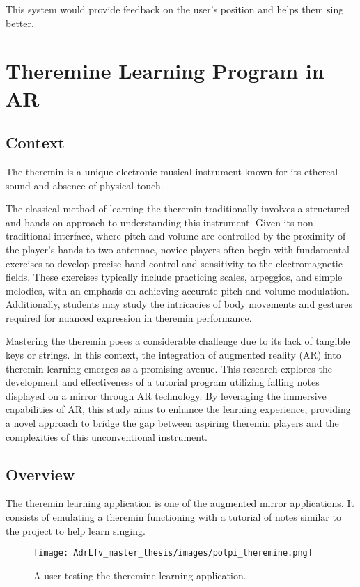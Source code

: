 This system would provide feedback on the user's position and helps them sing better.

\section{Theremine Learning Program in AR}

\subsection{Context}

The theremin is a unique electronic musical instrument known for its ethereal sound and absence of physical touch. 

The classical method of learning the theremin traditionally involves a structured and hands-on approach to understanding this instrument. Given its non-traditional interface, where pitch and volume are controlled by the proximity of the player's hands to two antennae, novice players often begin with fundamental exercises to develop precise hand control and sensitivity to the electromagnetic fields. These exercises typically include practicing scales, arpeggios, and simple melodies, with an emphasis on achieving accurate pitch and volume modulation. Additionally, students may study the intricacies of body movements and gestures required for nuanced expression in theremin performance. 

Mastering the theremin poses a considerable challenge due to its lack of tangible keys or strings. In this context, the integration of augmented reality (AR) into theremin learning emerges as a promising avenue. This research explores the development and effectiveness of a tutorial program utilizing falling notes displayed on a mirror through AR technology. By leveraging the immersive capabilities of AR, this study aims to enhance the learning experience, providing a novel approach to bridge the gap between aspiring theremin players and the complexities of this unconventional instrument.

\subsection{Overview}

The theremin learning application is one of the augmented mirror applications. It consists of emulating a theremin functioning with a tutorial of notes similar to the project to help learn singing. 

\begin{figure}[h]
    \centering
    \texttt{[image: AdrLfv\_master\_thesis/images/polpi\_theremine.png]}
    \caption{A user testing the theremine learning application.}
    \label{fig:polpi_theremine}
\end{figure}

